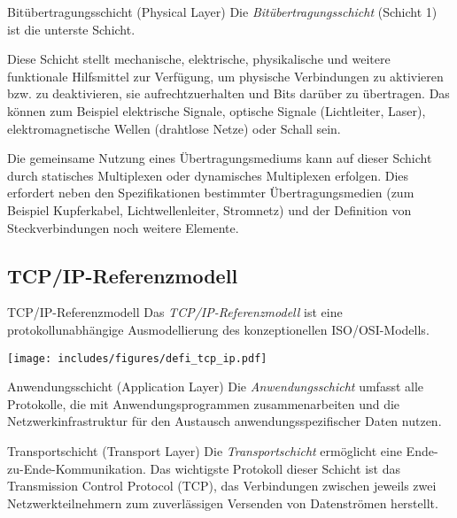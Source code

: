\begin{defi}{Bitübertragungsschicht (Physical Layer)}
    Die \emph{Bitübertragungsschicht} (Schicht 1) ist die unterste Schicht.

    Diese Schicht stellt mechanische, elektrische, physikalische und weitere funktionale Hilfsmittel zur Verfügung, um physische Verbindungen zu aktivieren bzw. zu deaktivieren, sie aufrechtzuerhalten und Bits darüber zu übertragen. Das können zum Beispiel elektrische Signale, optische Signale (Lichtleiter, Laser), elektromagnetische Wellen (drahtlose Netze) oder Schall sein.

    Die gemeinsame Nutzung eines Übertragungsmediums kann auf dieser Schicht durch statisches Multiplexen oder dynamisches Multiplexen erfolgen. Dies erfordert neben den Spezifikationen bestimmter Übertragungsmedien (zum Beispiel Kupferkabel, Lichtwellenleiter, Stromnetz) und der Definition von Steckverbindungen noch weitere Elemente.
\end{defi}

\subsection{TCP/IP-Referenzmodell}

\begin{defi}{TCP/IP-Referenzmodell}
    Das \emph{TCP/IP-Referenzmodell} ist eine protokollunabhängige Ausmodellierung des konzeptionellen ISO/OSI-Modells.

    \begin{center}
        \texttt{[image: includes/figures/defi\_tcp\_ip.pdf]}
    \end{center}
\end{defi}

\begin{defi}{Anwendungsschicht (Application Layer)}
    Die \emph{Anwendungsschicht} umfasst alle Protokolle, die mit Anwendungsprogrammen zusammenarbeiten und die Netzwerkinfrastruktur für den Austausch anwendungsspezifischer Daten nutzen.
\end{defi}

\begin{defi}{Transportschicht (Transport Layer)}
    Die \emph{Transportschicht} ermöglicht eine Ende-zu-Ende-Kommunikation. Das wichtigste Protokoll dieser Schicht ist das Transmission Control Protocol (TCP), das Verbindungen zwischen jeweils zwei Netzwerkteilnehmern zum zuverlässigen Versenden von Datenströmen herstellt.
\end{defi}


